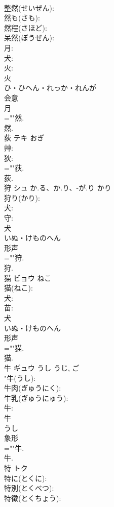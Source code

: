 \documentclass[8pt]{extreport}
\begin{document}
\begin{CJK}{UTF8}{min}
\\	整然(せいぜん): 
\\	然も(さも): 
\\	然程(さほど): 
\\	呆然(ぼうぜん): 
\\	月: 
\\	犬: 
\\	火: 
\\	火	
\\	ひ・ひへん・れっか・れんが	
\\	会意 
\\	月 
\\	=""然.
\\	然.
\\	荻	テキ	おぎ		
\\	艸: 
\\	狄: 
\\	=""荻.
\\	荻.
\\	狩	シュ	か.る、か.り、-が.り	かり	
\\	狩り(かり): 
\\	犬: 
\\	守: 
\\	犬	
\\	いぬ・けものへん	
\\	形声 
\\	=""狩.
\\	狩.
\\	猫	ビョウ	ねこ		
\\	猫(ねこ): 
\\	犬: 
\\	苗: 
\\	犬	
\\	いぬ・けものへん	
\\	形声 
\\	=""猫.
\\	猫.
\\	牛	ギュウ	うし	うじ, ご	
\\	"牛(うし): 
\\	牛肉(ぎゅうにく): 
\\	牛乳(ぎゅうにゅう): 
\\	牛: 
\\	牛	
\\	うし	
\\	象形 
\\	=""牛.
\\	牛.
\\	特	トク			
\\	特に(とくに): 
\\	特別(とくべつ): 
\\	特徴(とくちょう): 

\end{CJK}
\end{document}
